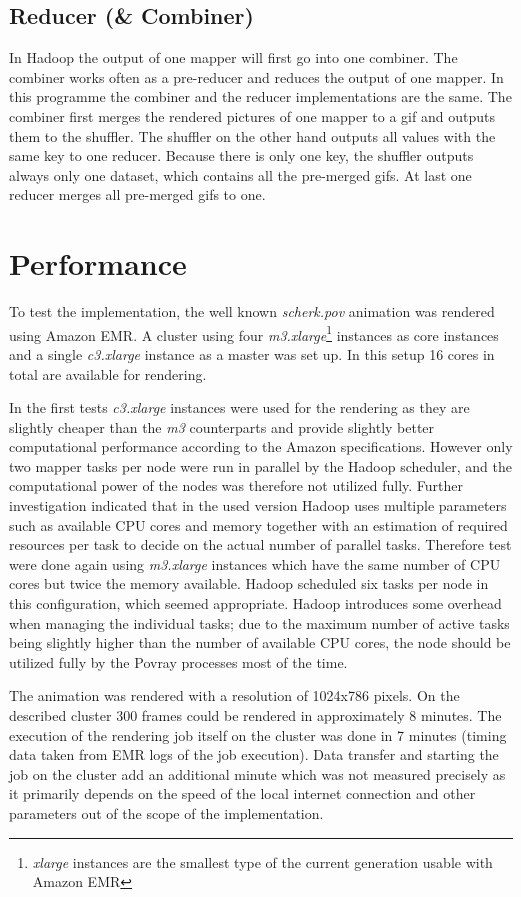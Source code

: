 \documentclass{article}
\begin{document}
\subsection{Reducer (\& Combiner)}
In Hadoop the output of one mapper will first go into one combiner. The combiner works often as a pre-reducer and reduces the output of one mapper. In this programme the combiner and the reducer implementations are the same. The combiner first merges the rendered pictures of one mapper to a gif and outputs them to the shuffler. The shuffler on the other hand outputs all values with the same key to one reducer. Because there is only one key, the shuffler outputs always only one dataset, which contains all the pre-merged gifs. At last one reducer merges all pre-merged gifs to one.

\section{Performance}

To test the implementation, the well known \emph{scherk.pov} animation was rendered using Amazon EMR. A cluster using four \emph{m3.xlarge}\footnote{\emph{xlarge} instances are the smallest type of the current generation usable with Amazon EMR} instances as core instances and a single \emph{c3.xlarge} instance as a master was set up. In this setup 16 cores in total are available for rendering.

In the first tests \emph{c3.xlarge} instances were used for the rendering as they are slightly cheaper than the \emph{m3} counterparts and provide slightly better computational performance according to the Amazon specifications. However only two mapper tasks per node were run in parallel by the Hadoop scheduler, and the computational power of the nodes was therefore not utilized fully. Further investigation indicated that in the used version Hadoop uses multiple parameters such as available CPU cores and memory together with an estimation of required resources per task to decide on the actual number of parallel tasks. Therefore test were done again using \emph{m3.xlarge} instances which have the same number of CPU cores but twice the memory available. Hadoop scheduled six tasks per node in this configuration, which seemed appropriate. Hadoop introduces some overhead when managing the individual tasks; due to the maximum number of active tasks being slightly higher than the number of available CPU cores, the node should be utilized fully by the Povray processes most of the time.

The animation was rendered with a resolution of 1024x786 pixels. On the described cluster 300 frames could be rendered in approximately 8 minutes. The execution of the rendering job itself on the cluster was done in 7 minutes (timing data taken from EMR logs of the job execution). Data transfer and starting the job on the cluster add an additional minute which was not measured precisely as it primarily depends on the speed of the local internet connection and other parameters out of the scope of the implementation.
\end{document}
